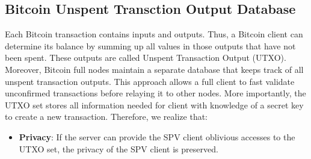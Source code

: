\subsection{Bitcoin Unspent Transction Output Database}
Each Bitcoin transaction contains inputs and outputs. 
Thus, a Bitcoin client can determine its balance by summing up all values in those outputs that have not been spent.
These outputs are called Unspent Transaction Output (UTXO).
Moreover, Bitcoin full nodes maintain a separate database that keeps track of all unspent transaction outputs. 
This approach allows a full client to fast validate unconfirmed transactions before relaying it to other nodes. 
More importantly, the UTXO set stores all information needed for client with knowledge of a secret key to create a new transaction. 
Therefore, we realize that:
\begin{itemize}
	\item \textbf{Privacy}: If the server can provide the SPV client oblivious accesses to the UTXO set, the privacy of the SPV client is preserved.
\end{itemize}
